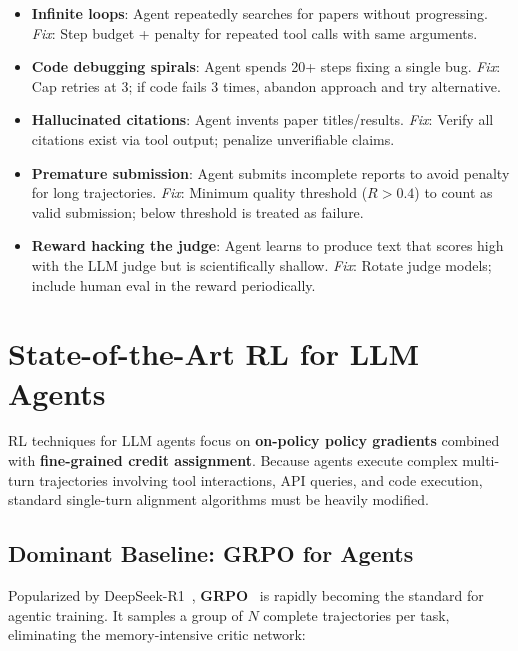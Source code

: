 \begin{warningbox}
\begin{itemize}
  \item \textbf{Infinite loops}: Agent repeatedly searches for papers without progressing. \emph{Fix}: Step budget + penalty for repeated tool calls with same arguments.
  \item \textbf{Code debugging spirals}: Agent spends 20+ steps fixing a single bug. \emph{Fix}: Cap retries at 3; if code fails 3 times, abandon approach and try alternative.
  \item \textbf{Hallucinated citations}: Agent invents paper titles/results. \emph{Fix}: Verify all citations exist via tool output; penalize unverifiable claims.
  \item \textbf{Premature submission}: Agent submits incomplete reports to avoid penalty for long trajectories. \emph{Fix}: Minimum quality threshold ($R > 0.4$) to count as valid submission; below threshold is treated as failure.
  \item \textbf{Reward hacking the judge}: Agent learns to produce text that scores high with the LLM judge but is scientifically shallow. \emph{Fix}: Rotate judge models; include human eval in the reward periodically.
\end{itemize}
\end{warningbox}

\section{State-of-the-Art RL for LLM Agents}
\label{state-of-the-art-rl-for-llm-agents}

RL techniques for LLM agents focus on \textbf{on-policy policy gradients} combined with \textbf{fine-grained credit assignment}. Because agents execute complex multi-turn trajectories involving tool interactions, API queries, and code execution, standard single-turn alignment algorithms must be heavily modified.

\subsection{Dominant Baseline: GRPO for Agents}
\label{dominant-baseline-grpo-for-agents}

Popularized by DeepSeek-R1~\cite{deepseek2025r1}, \textbf{GRPO}~\cite{shao2024deepseekmath} is rapidly becoming the standard for agentic training. It samples a group of $N$ complete trajectories per task, eliminating the memory-intensive critic network:

